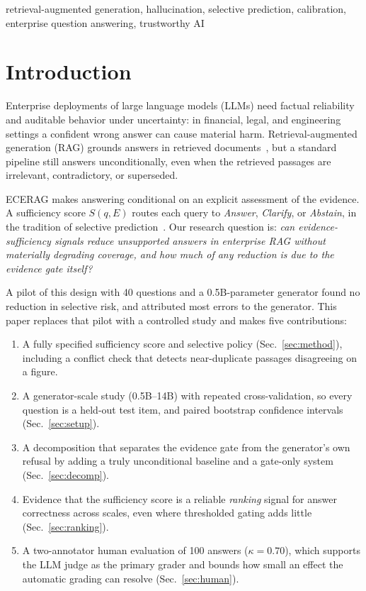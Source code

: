 \documentclass[conference,letterpaper]{IEEEtran}
\begin{document}
\begin{IEEEkeywords}
retrieval-augmented generation, hallucination, selective prediction, calibration,
enterprise question answering, trustworthy AI
\end{IEEEkeywords}

\section{Introduction}
Enterprise deployments of large language models (LLMs) need factual reliability and auditable
behavior under uncertainty: in financial, legal, and engineering settings a confident wrong
answer can cause material harm. Retrieval-augmented generation (RAG) grounds answers in retrieved
documents~\cite{lewis2020rag,gao2023survey}, but a standard pipeline still answers
unconditionally, even when the retrieved passages are irrelevant, contradictory, or superseded.

ECERAG makes answering conditional on an explicit assessment of the evidence. A sufficiency score
$S(q,E)$ routes each query to \emph{Answer}, \emph{Clarify}, or \emph{Abstain}, in the tradition of
selective prediction~\cite{geifman2019selectivenet,kamath2020selective}. Our research question is:
\emph{can evidence-sufficiency signals reduce unsupported answers in enterprise RAG without
materially degrading coverage, and how much of any reduction is due to the evidence gate itself?}

A pilot of this design with 40 questions and a 0.5B-parameter generator found no reduction in
selective risk, and attributed most errors to the generator. This paper replaces that pilot with a
controlled study and makes five contributions:
\begin{enumerate}
\item A fully specified sufficiency score and selective policy (Sec.~\ref{sec:method}), including
a conflict check that detects near-duplicate passages disagreeing on a figure.
\item A generator-scale study (0.5B--14B) with repeated cross-validation, so every question is a
held-out test item, and paired bootstrap confidence intervals (Sec.~\ref{sec:setup}).
\item A decomposition that separates the evidence gate from the generator's own refusal by adding
a truly unconditional baseline and a gate-only system (Sec.~\ref{sec:decomp}).
\item Evidence that the sufficiency score is a reliable \emph{ranking} signal for answer
correctness across scales, even where thresholded gating adds little (Sec.~\ref{sec:ranking}).
\item A two-annotator human evaluation of 100 answers ($\kappa=0.70$), which supports the LLM
judge as the primary grader and bounds how small an effect the automatic grading can resolve
(Sec.~\ref{sec:human}).
\end{enumerate}
\end{document}
